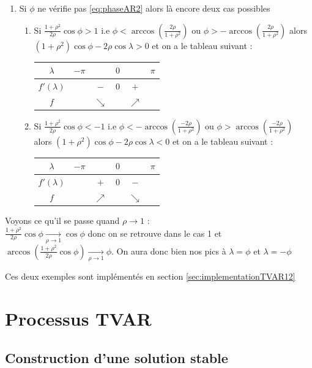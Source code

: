 \documentclass{report}
\begin{document}
\begin{Ex}[Cas où p=2 à racines complexes conjuguées]
\begin{enumerate}
\begin{center}
\end{center}
\item Si $\phi$ ne vérifie pas \eqref{eq:phaseAR2} alors là encore deux cas possibles
\begin{enumerate}
\item Si $\frac{1+\rho^2}{2\rho} \cos{\phi} > 1$ i.e $\phi < \arccos\left( \frac{2\rho}{1+\rho^2} \right)$ ou $\phi > -\arccos\left( \frac{2\rho}{1+\rho^2} \right)$ alors $(1+\rho^2)\cos{\phi} - 2\rho \cos{\lambda} >0$ et on a le tableau suivant :
\begin{center}
\begin{tabular}{c|ccccc}
$\lambda$ & $-\pi$ & & $0$ & & $\pi$  \\
\hline
$f'(\lambda)$ & & $-$ & $0$ & $+$ & \\
\hline
$f$ & & $\searrow$ & & $\nearrow$ & \\
\end{tabular}
\end{center}
\item Si $\frac{1+\rho^2}{2\rho} \cos{\phi} < -1$ i.e $\phi < -\arccos\left( \frac{-2\rho}{1+\rho^2} \right)$ ou $\phi > \arccos\left( \frac{-2\rho}{1+\rho^2} \right)$ alors $(1+\rho^2)\cos{\phi} - 2\rho \cos{\lambda} <0$ et on a le tableau suivant :
\begin{center}
\begin{tabular}{c|ccccc}
$\lambda$ & $-\pi$ & & $0$ & & $\pi$  \\
\hline
$f'(\lambda)$ & & $+$ & $0$ & $-$ & \\
\hline
$f$ & & $\nearrow$ & & $\searrow$ & \\
\end{tabular}
\end{center}
\end{enumerate}
\end{enumerate}
Voyons ce qu'il se passe quand $\rho \to 1$ : \\
$\frac{1+\rho^2}{2\rho} \cos{\phi}  \xrightarrow[\rho \to 1]{} \cos{\phi}$ donc on se retrouve dans le cas 1 et $\arccos\left(\frac{1+\rho^2}{2\rho} \cos{\phi}\right) \xrightarrow[\rho \to 1]{} \phi$. On aura donc bien nos pics à $\lambda = \phi$ et $\lambda = -\phi$
\end{Ex}
Ces deux exemples sont implémentés en section \ref{sec:implementationTVAR12}
\chapter{Processus TVAR}\label{chap:TVAR}
\section{Construction d'une solution stable}
\end{document}
